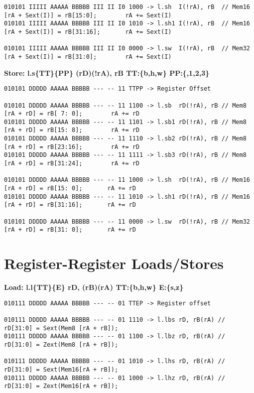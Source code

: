 \begin{landscape}
\begin{verbatim}
010101 IIIII AAAAA BBBBB III II I0 1000 -> l.sh  I(!rA), rB  // Mem16 [rA + Sext(I)] = rB[15:0];        rA += Sext(I)
010101 IIIII AAAAA BBBBB III II I0 1010 -> l.sh1 I(!rA), rB  // Mem16 [rA + Sext(I)] = rB[31:16];       rA += Sext(I)

010101 IIIII AAAAA BBBBB III II I0 0000 -> l.sw  I(!rA), rB  // Mem32 [rA + Sext(I)] = rB[31:0];        rA += Sext(I)
\end{verbatim}


\textbf{Store: l.s\{TT\}\{PP\} (rD)(!rA), rB TT:\{b,h,w\} PP:\{,1,2,3\}}

\begin{verbatim}
010101 DDDDD AAAAA BBBBB --- -- 11 TTPP -> Register Offset

010101 DDDDD AAAAA BBBBB --- -- 11 1100 -> l.sb  rD(!rA), rB // Mem8 [rA + rD] = rB[ 7: 0];        rA += rD
010101 DDDDD AAAAA BBBBB --- -- 11 1101 -> l.sb1 rD(!rA), rB // Mem8 [rA + rD] = rB[15: 8];        rA += rD
010101 DDDDD AAAAA BBBBB --- -- 11 1110 -> l.sb2 rD(!rA), rB // Mem8 [rA + rD] = rB[23:16];        rA += rD
010101 DDDDD AAAAA BBBBB --- -- 11 1111 -> l.sb3 rD(!rA), rB // Mem8 [rA + rD] = rB[31:24];        rA += rD

010101 DDDDD AAAAA BBBBB --- -- 11 1000 -> l.sh  rD(!rA), rB // Mem16 [rA + rD] = rB[15: 0];       rA += rD
010101 DDDDD AAAAA BBBBB --- -- 11 1010 -> l.sh1 rD(!rA), rB // Mem16 [rA + rD] = rB[31:16];       rA += rD

010101 DDDDD AAAAA BBBBB --- -- 11 0000 -> l.sw  rD(!rA), rB // Mem32 [rA + rD] = rB[31: 0];       rA += rD
\end{verbatim}


\newpage
\section{Register-Register Loads/Stores}
\textbf{Load: l.l\{TT\}\{E\} rD, (rB)(rA)  TT:\{b,h,w\} E:\{s,z\}}

\begin{verbatim}
010111 DDDDD AAAAA BBBBB --- -- 01 TTEP -> Register offset

010111 DDDDD AAAAA BBBBB --- -- 01 1110 -> l.lbs rD, rB(rA) // rD[31:0] = Sext(Mem8 [rA + rB]);
010111 DDDDD AAAAA BBBBB --- -- 01 1100 -> l.lbz rD, rB(rA) // rD[31:0] = Zext(Mem8 [rA + rB]);

010111 DDDDD AAAAA BBBBB --- -- 01 1010 -> l.lhs rD, rB(rA) // rD[31:0] = Sext(Mem16[rA + rB]);
010111 DDDDD AAAAA BBBBB --- -- 01 1000 -> l.lhz rD, rB(rA) // rD[31:0] = Zext(Mem16[rA + rB]);


\end{verbatim}
\end{landscape}
